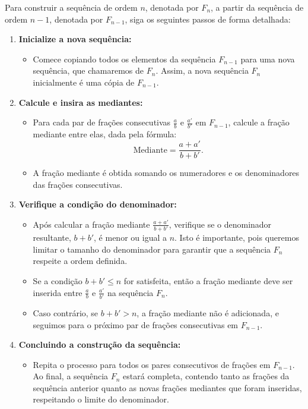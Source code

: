 \documentclass{hipatia}
\theoremstyle{definition} %
\begin{document}
Para construir a sequência de ordem \(n\), denotada por \(F_n\), a partir da sequência de ordem \(n-1\), denotada por \(F_{n-1}\), siga os seguintes passos de forma detalhada:

\begin{enumerate}
    \item \textbf{Inicialize a nova sequência:} 
    \begin{itemize}
        \item Comece copiando todos os elementos da sequência \(F_{n-1}\) para uma nova sequência, que chamaremos de \(F_n\). Assim, a nova sequência \(F_n\) inicialmente é uma cópia de \(F_{n-1}\).
    \end{itemize}

    \item \textbf{Calcule e insira as mediantes:} 
    \begin{itemize}
        \item Para cada par de frações consecutivas \(\frac{a}{b}\) e \(\frac{a'}{b'}\) em \(F_{n-1}\), calcule a fração mediante entre elas, dada pela fórmula:
        \[
        \text{Mediante} = \frac{a + a'}{b + b'}.
        \]
        \item A fração mediante é obtida somando os numeradores e os denominadores das frações consecutivas.
    \end{itemize}

    \item \textbf{Verifique a condição do denominador:}
    \begin{itemize}
        \item Após calcular a fração mediante \(\frac{a + a'}{b + b'}\), verifique se o denominador resultante, \(b + b'\), é menor ou igual a \(n\). Isto é importante, pois queremos limitar o tamanho do denominador para garantir que a sequência \(F_n\) respeite a ordem definida.
        \item Se a condição \(b + b' \leq n\) for satisfeita, então a fração mediante deve ser inserida entre \(\frac{a}{b}\) e \(\frac{a'}{b'}\) na sequência \(F_n\).
        \item Caso contrário, se \(b + b' > n\), a fração mediante não é adicionada, e seguimos para o próximo par de frações consecutivas em \(F_{n-1}\).
    \end{itemize}
    
    \item \textbf{Concluindo a construção da sequência:}
    \begin{itemize}
        \item Repita o processo para todos os pares consecutivos de frações em \(F_{n-1}\). Ao final, a sequência \(F_n\) estará completa, contendo tanto as frações da sequência anterior quanto as novas frações mediantes que foram inseridas, respeitando o limite do denominador.
    \end{itemize}
\end{enumerate}
\end{document}
